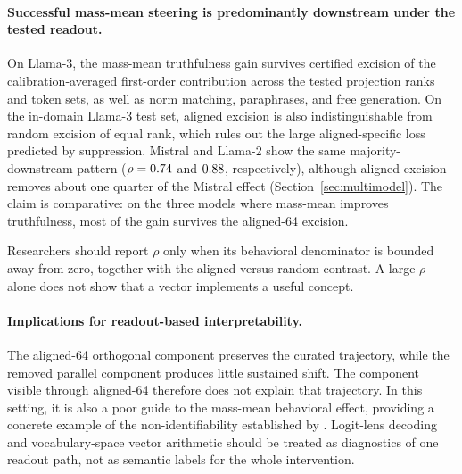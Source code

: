 \paragraph{Successful mass-mean steering is predominantly downstream under the tested readout.}
On Llama-3, the mass-mean truthfulness gain survives certified excision of the calibration-averaged first-order contribution across the tested projection ranks and token sets, as well as norm matching, paraphrases, and free generation. On the in-domain Llama-3 test set, aligned excision is also indistinguishable from random excision of equal rank, which rules out the large aligned-specific loss predicted by suppression. Mistral and Llama-2 show the same majority-downstream pattern ($\rho = 0.74$ and $0.88$, respectively), although aligned excision removes about one quarter of the Mistral effect (Section~\ref{sec:multimodel}). The claim is comparative: on the three models where mass-mean improves truthfulness, most of the gain survives the aligned-64 excision.

Researchers should report $\rho$ only when its behavioral denominator is bounded away from zero, together with the aligned-versus-random contrast. A large $\rho$ alone does not show that a vector implements a useful concept.

\paragraph{Implications for readout-based interpretability.}
The aligned-64 orthogonal component preserves the curated trajectory, while the removed parallel component produces little sustained shift. The component visible through aligned-64 therefore does not explain that trajectory. In this setting, it is also a poor guide to the mass-mean behavioral effect, providing a concrete example of the non-identifiability established by \citet{venkatesh2026nonid}. Logit-lens decoding and vocabulary-space vector arithmetic should be treated as diagnostics of one readout path, not as semantic labels for the whole intervention.
